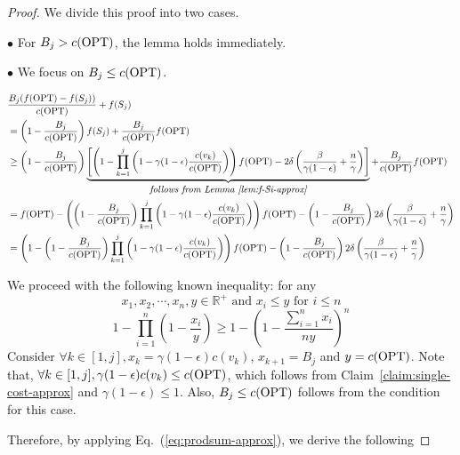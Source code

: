 \documentclass[10pt]{article} %
\theoremstyle{remark}
\newcommand{\OPT}{{\rm OPT}}
\begin{document}
\begin{proof}

We divide this proof into two cases.

$\bullet$ For \textbf{$B_j > c(\OPT)$}, the lemma holds immediately.

\smallskip
$\bullet$ We focus on \textbf{$B_j \leq c(\OPT)$}.

\begin{align*}
    & \displaystyle\frac{B_j(f(\OPT) - f(S_{j}))}{c(\OPT)} +f(S_{j}) \\
        &= \displaystyle\left(1-\frac{B_j}{c(\OPT)}\right)f(S_{j}) + \frac{B_j}{c(\OPT)}f(\OPT)\\
        &\geq  \displaystyle\left(1-\frac{B_j}{c(\OPT)}\right)\underbrace{\left[\left(   1- \prod_{k=1}^{j}  \left(1- \gamma(1-\epsilon) \frac{c(v_k)}{c(\OPT)} \right)   \right) f(\OPT)- 2\delta\left(\frac{\beta}{\gamma(1-\epsilon)}+ \frac{n}{\gamma}\right)\right]}_{\mbox{\it follows from Lemma~\ref{lem:f-Si-approx}}} + \displaystyle\frac{B_j}{c(\OPT)}f(\OPT)\\
        &=f(\OPT) - \displaystyle\left(\left(1-\frac{B_j}{c(\OPT)}\right)\prod_{k=1}^{j} \left(1- \gamma(1-\epsilon) \frac{c(v_k)}{c(\OPT)} \right)\right)f(\OPT) - \left(1-\frac{B_j}{c(\OPT)}\right)2\delta\left(\frac{\beta}{\gamma(1-\epsilon)}+ \frac{n}{\gamma}\right)\\
        &=\left( 1- \displaystyle\left(1-\frac{B_j}{c(\OPT)}\right)\prod_{k=1}^{j} \left(1- \gamma(1-\epsilon) \frac{c(v_k)}{c(\OPT)} \right) \right)f(\OPT) - \left(1-\frac{B_j}{c(\OPT)}\right)2\delta\left(\frac{\beta}{\gamma(1-\epsilon)}+ \frac{n}{\gamma}\right)
\end{align*}

We proceed with the following known inequality: for any 
\[x_1, x_2, \cdots, x_n, y \in \mathbb{R}^{+} \mbox{ and } x_i \leq y \mbox{ for } i \leq n\]
\begin{equation}
1-\prod_{i=1}^n\left(1-\frac{x_i}{y}\right) \geq 1-\left(1-\frac{\sum_{i=1}^n x_i}{n y}\right)^n
\label{eq:prodsum-approx}
\end{equation}
Consider $\forall k\in [1,j], x_k = \gamma(1-\epsilon) c(v_k)$, $x_{k+1} = B_j$ and $y = c(\OPT)$. Note that, 
$\forall k\in [1,j], \gamma(1-\epsilon) c(v_k) \leq c(\OPT)$, which follows from Claim~\ref{claim:single-cost-approx} and 
$\gamma(1-\epsilon) \leq 1$. Also, $B_j \leq c(\OPT)$ follows from the condition for this case. 

Therefore, by applying Eq.~(\ref{eq:prodsum-approx}), we derive the following


\end{proof}
\end{document}
